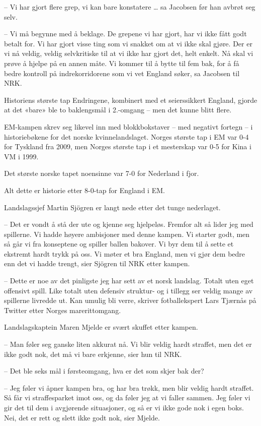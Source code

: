– Vi har gjort flere grep, vi kan bare konstatere … sa Jacobsen før han avbrøt seg selv.

– Vi må begynne med å beklage. De grepene vi har gjort, har vi ikke fått godt betalt for. Vi har gjort visse ting som vi snakket om at vi ikke skal gjøre. Der er vi nå veldig, veldig selvkritiske til at vi ikke har gjort det, helt enkelt. Nå skal vi prøve å hjelpe på en annen måte. Vi kommer til å bytte til fem bak, for å få bedre kontroll på indrekorridorene som vi vet England søker, sa Jacobsen til NRK.

Historiens største tap
Endringene, kombinert med et seierssikkert England, gjorde at det «bare» ble to baklengsmål i 2.-omgang – men det kunne blitt flere.

EM-kampen skrev seg likevel inn med blokkbokstaver – med negativt fortegn – i historiebøkene for det norske kvinnelandslaget. Norges største tap i EM var 0-4 for Tyskland fra 2009, men Norges største tap i et mesterskap var 0-5 for Kina i VM i 1999.

Det største norske tapet noensinne var 7-0 for Nederland i fjor.

Alt dette er historie etter 8-0-tap for England i EM.

Landslagssjef Martin Sjögren er langt nede etter det tunge nederlaget.

– Det er vondt å stå der ute og kjenne seg hjelpeløs. Fremfor alt så lider jeg med spillerne. Vi hadde høyere ambisjoner med denne kampen. Vi starter godt, men så går vi fra konseptene og spiller ballen bakover. Vi byr dem til å sette et ekstremt hardt trykk på oss. Vi møter et bra England, men vi gjør dem bedre enn det vi hadde trengt, sier Sjögren til NRK etter kampen.

– Dette er noe av det pinligste jeg har sett av et norsk landslag. Totalt uten eget offensivt spill. Like totalt uten defensiv struktur- og i tillegg ser veldig mange av spillerne livredde ut. Kan umulig bli verre, skriver fotballekspert Lars Tjærnås på Twitter etter Norges marerittomgang.

Landslagskaptein Maren Mjelde er svært skuffet etter kampen.

– Man føler seg ganske liten akkurat nå. Vi blir veldig hardt straffet, men det er ikke godt nok, det må vi bare erkjenne, sier hun til NRK.

– Det ble seks mål i førsteomgang, hva er det som skjer bak der?

– Jeg føler vi åpner kampen bra, og har bra trøkk, men blir veldig hardt straffet. Så får vi straffesparket imot oss, og da føler jeg at vi faller sammen. Jeg føler vi gir det til dem i avgjørende situasjoner, og så er vi ikke gode nok i egen boks. Nei, det er rett og slett ikke godt nok, sier Mjelde.

